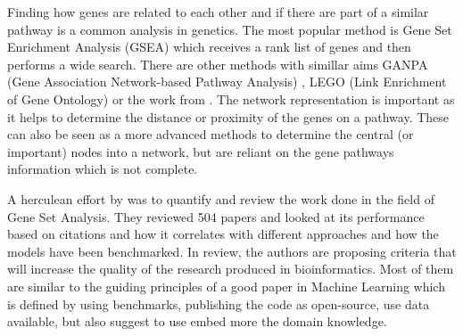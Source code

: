 Finding how genes are related to each other and if there are part of a similar pathway is a common analysis in genetics. The most popular method is Gene Set Enrichment Analysis (GSEA) which receives a rank list of genes and then performs a wide search. There are other methods with simillar aims GANPA (Gene Association Network-based Pathway Analysis) \cite{Fang2012-vr}, LEGO (Link Enrichment of Gene Ontology) \cite{Dong2016-zs} or the work from \citet{Cava2018-rv}. The network representation is important as it helps to determine the distance or proximity of the genes on a pathway. These can also be seen as a more advanced methods to determine the central (or important) nodes into a network, but are reliant on the gene pathways information which is not complete.

A herculean effort by \citet{Xie2021-al} was to quantify and review the work done in the field of Gene Set Analysis. They reviewed 504 papers and looked at its performance based on citations and how it correlates with different approaches and how the models have been benchmarked. In review, the authors are proposing criteria that will increase the quality of the research produced in bioinformatics. Most of them are similar to the guiding principles of a good paper in Machine Learning which is defined by using benchmarks, publishing the code as open-source, use data available, but also suggest to use embed more the domain knowledge.



